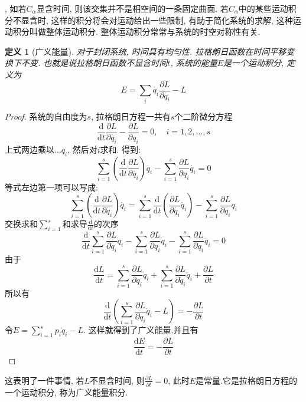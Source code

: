 \documentclass[a4paper,11pt]{article}
\newtheorem{definition}{\hspace{2em}定义}[section]
\newtheorem{proof}{证明}[section]
\begin{document}
, 如若$C_\alpha$显含时间, 则该交集并不是相空间的一条固定曲面. 若$C_\alpha$中的某些运动积分不显含时, 这样的积分将会对运动给出一些限制, 有助于简化系统的求解, 这种运动积分叫做整体运动积分. 整体运动积分常常与系统的时空对称性有关.
\begin{definition}[广义能量]
  对于封闭系统, 时间具有均匀性. 拉格朗日函数在时间平移变换下不变. 也就是说拉格朗日函数不显含时间$t$, 系统的能量$E$是一个运动积分, 定义为
  \begin{equation}\label{General Enery}
    E=\sum_{i}\dot{q_i}\frac{\partial{L}}{\partial{\dot{q_i}}}-L
  \end{equation}
\end{definition}
\begin{proof}
系统的自由度为$s$, 拉格朗日方程一共有$s$个二阶微分方程
\begin{equation*}
  \frac{\mathrm{d}}{\mathrm{d}t}\frac{\partial{L}}{\partial{\dot{q_i}}}-\frac{\partial{L}}{\partial{q_i}}=0,\quad i=1,2,\dots,s
\end{equation*}
上式两边乘以$\dots{q_i}$, 然后对$i$求和. 得到:
\begin{equation*}
  \sum_{i=1}^{s}\left(\frac{\mathrm{d}}{\mathrm{d}t}\frac{\partial{L}}{\partial{\dot{q_i}}}\right)\dot{q_i}-\sum_{i=1}^{s}\frac{\partial{L}}{\partial{q_i}}\dot{q_i}=0
\end{equation*}
等式左边第一项可以写成:
\begin{equation*}
  \sum_{i=1}^{s}\left(\frac{\mathrm{d}}{\mathrm{d}t}\frac{\partial{L}}{\partial{\dot{q_i}}}\right)\dot{q_i}=\sum_{i=1}^{s}\frac{\mathrm{d}}{\mathrm{d}t}\left(\frac{\partial L}{\partial{\dot{q_i}}}\dot{q_i}\right)-\sum_{i=1}^{s}\frac{\partial L}{\partial{\dot{q_i}}}\ddot{q_i}
\end{equation*}
交换求和$\sum_{i=1}^{s}$和求导$\frac{\mathrm{d}}{\mathrm{d}t}$的次序
\begin{equation*}
  \frac{\mathrm{d}}{\mathrm{d} t } \sum _ { i = 1 } ^ { s } \frac { \partial L } { \partial\dot{q}_{i}}\dot{q}_{i}-\sum_{i=1}^{s}\frac{\partial L}{\partial q_{i}}\dot{q}_{i}-\sum_{i=1}^{s}\frac{\partial L}{\partial\dot{q}_{i}}\ddot{q}_{i}=0
\end{equation*}
由于
\begin{equation*}
  \frac{\mathrm{d}L}{\mathrm{d}t}=\sum_{i=1}^{s}\frac{\partial L}{\partial q_{i}}\dot{q}_{i}+\sum_{i=1}^{s}\frac{\partial L}{\partial\dot{q}_{i}}\ddot{q}_{i}+\frac{\partial L}{\partial t}
\end{equation*}
所以有
\begin{equation*}
  \frac{\mathrm{d}}{\mathrm{d}t}\left(\sum_{i=1}^{s}\frac{\partial L}{\partial\dot{q}_{i}}\dot{q}_{i}-L\right)=-\frac{\partial L}{\partial t}
\end{equation*}
令$E=\sum_{i=1}^{s}p_{i}\dot{q}_{i}-L$. 这样就得到了广义能量.并且有
\begin{equation*}
  \frac{\mathrm{d}E}{\mathrm{d}t}=-\frac{\partial L}{\partial t}
\end{equation*}
\end{proof}
这表明了一件事情, 若$L$不显含时间, 则$\frac{\partial L}{\partial t}=0$, 此时$E$是常量.它是拉格朗日方程的一个运动积分, 称为广义能量积分.
\end{document}
